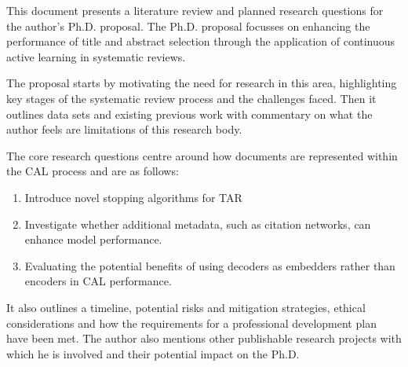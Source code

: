 \documentclass[../main.tex]{subfiles}
\begin{document}
This document presents a literature review and planned research questions for the author's Ph.D. proposal. The Ph.D. proposal focusses on enhancing the performance of title and abstract selection through the application of continuous active learning in systematic reviews.

The proposal starts by motivating the need for research in this area, highlighting key stages of the systematic review process and the challenges faced.  Then it outlines data sets and existing previous work with commentary on what the author feels are limitations of this research body.

The core research questions centre around how documents are represented within the CAL process and are as follows:

\begin{enumerate}
    \item Introduce novel stopping algorithms for TAR
    \item Investigate whether additional metadata, such as citation networks, can enhance model performance.
    \item Evaluating the potential benefits of using decoders as embedders rather than encoders in CAL performance.
\end{enumerate}

It also outlines a timeline, potential risks and mitigation strategies, ethical considerations and how the requirements for a professional development plan have been met. The author also mentions other publishable research projects with which he is involved and their potential impact on the Ph.D.
\end{document}
